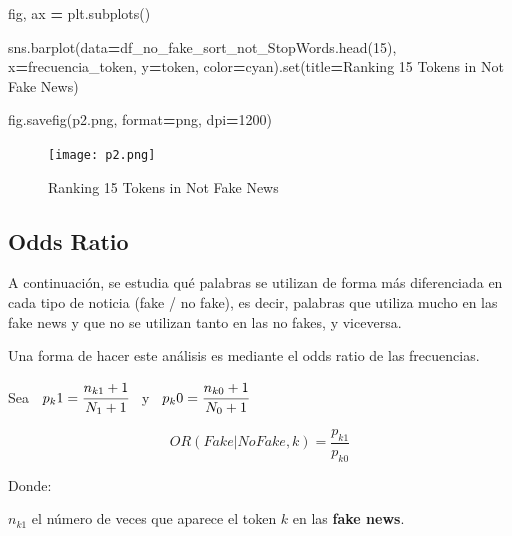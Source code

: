 \documentclass[
  11pt,
  a4paper,
]{article}
\newenvironment{Shaded}{\begin{snugshade}}{\end{snugshade}}
\newcommand{\BuiltInTok}[1]{#1}
\newcommand{\DecValTok}[1]{\textcolor[rgb]{0.00,0.00,0.81}{#1}}
\newcommand{\NormalTok}[1]{#1}
\newcommand{\OperatorTok}[1]{\textcolor[rgb]{0.81,0.36,0.00}{\textbf{#1}}}
\newcommand{\StringTok}[1]{\textcolor[rgb]{0.31,0.60,0.02}{#1}}
\begin{document}
\begin{Shaded}
\begin{Highlighting}[]
\NormalTok{fig, ax }\OperatorTok{=}\NormalTok{ plt.subplots()}

\NormalTok{sns.barplot(data}\OperatorTok{=}\NormalTok{df\_no\_fake\_sort\_not\_StopWords.head(}\DecValTok{15}\NormalTok{), x}\OperatorTok{=}\StringTok{\textquotesingle{}frecuencia\_token\textquotesingle{}}\NormalTok{, y}\OperatorTok{=}\StringTok{\textquotesingle{}token\textquotesingle{}}\NormalTok{, color}\OperatorTok{=}\StringTok{\textquotesingle{}cyan\textquotesingle{}}\NormalTok{).}\BuiltInTok{set}\NormalTok{(title}\OperatorTok{=}\StringTok{\textquotesingle{}Ranking 15 Tokens in Not Fake News\textquotesingle{}}\NormalTok{) }

\NormalTok{fig.savefig(}\StringTok{\textquotesingle{}p2.png\textquotesingle{}}\NormalTok{, }\BuiltInTok{format}\OperatorTok{=}\StringTok{\textquotesingle{}png\textquotesingle{}}\NormalTok{, dpi}\OperatorTok{=}\DecValTok{1200}\NormalTok{)}
\end{Highlighting}
\end{Shaded}

\begin{figure}
\centering
\texttt{[image: p2.png]}
\caption{Ranking 15 Tokens in Not Fake News}
\end{figure}

\hypertarget{odds-ratio}{%
\subsection{Odds Ratio}\label{odds-ratio}}

A continuación, se estudia qué palabras se utilizan de forma más
diferenciada en cada tipo de noticia (fake / no fake), es decir,
palabras que utiliza mucho en las fake news y que no se utilizan tanto
en las no fakes, y viceversa.

Una forma de hacer este análisis es mediante el odds ratio de las
frecuencias.

Sea \(\hspace{0.2cm}p_k1 = \cfrac{n_{k1} + 1}{N_1 + 1}\hspace{0.2cm}\) y
\(\hspace{0.2cm}p_k0 = \cfrac{n_{k0} + 1}{N_0 +1}\)

\[OR(Fake|NoFake , k) = \dfrac{ p_{k1} }{ p_{k0} }\]

Donde:

\(n_{k1}\) el número de veces que aparece el token \(k\) en las
\textbf{fake news}.
\end{document}
